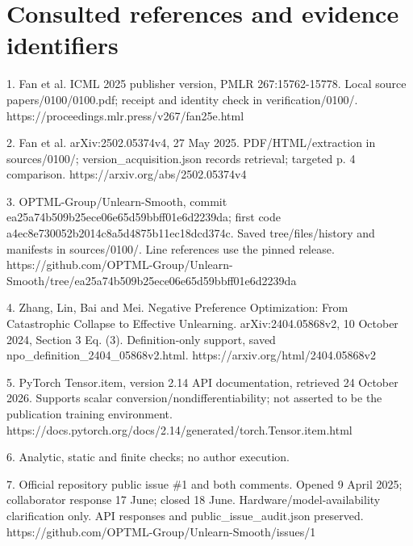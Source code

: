 \documentclass[10pt]{article}
\begin{document}
\section*{Consulted references and evidence identifiers}
1. Fan et al. ICML 2025 publisher version, PMLR 267:15762-15778. Local source papers/0100/0100.pdf; receipt and identity check in verification/0100/. https://proceedings.mlr.press/v267/fan25e.html\par
2. Fan et al. arXiv:2502.05374v4, 27 May 2025. PDF/HTML/extraction in sources/0100/; version\_acquisition.json records retrieval; targeted p. 4 comparison. https://arxiv.org/abs/2502.05374v4\par
3. OPTML-Group/Unlearn-Smooth, commit ea25a74b509b25ece06e65d59bbff01e6d2239da; first code a4ec8e730052b2014c8a5d4875b11ec18dcd374c. Saved tree/files/history and manifests in sources/0100/. Line references use the pinned release. https://github.com/OPTML-Group/Unlearn-Smooth/tree/ea25a74b509b25ece06e65d59bbff01e6d2239da\par
4. Zhang, Lin, Bai and Mei. Negative Preference Optimization: From Catastrophic Collapse to Effective Unlearning. arXiv:2404.05868v2, 10 October 2024, Section 3 Eq. (3). Definition-only support, saved npo\_definition\_2404\_05868v2.html. https://arxiv.org/html/2404.05868v2\par
5. PyTorch Tensor.item, version 2.14 API documentation, retrieved 24 October 2026. Supports scalar conversion/nondifferentiability; not asserted to be the publication training environment. https://docs.pytorch.org/docs/2.14/generated/torch.Tensor.item.html\par
6. Analytic, static and finite checks; no author execution.\par
7. Official repository public issue \#1 and both comments. Opened 9 April 2025; collaborator response 17 June; closed 18 June. Hardware/model-availability clarification only. API responses and public\_issue\_audit.json preserved. https://github.com/OPTML-Group/Unlearn-Smooth/issues/1\par
\end{document}
